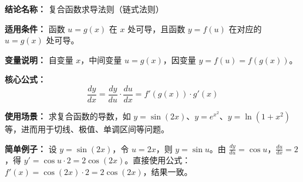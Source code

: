 \textbf{结论名称：} 复合函数求导法则（链式法则）

\textbf{适用条件：} 函数 $u=g(x)$ 在 $x$ 处可导，且函数 $y=f(u)$ 在对应的 $u=g(x)$ 处可导。

\textbf{变量说明：} 自变量 $x$，中间变量 $u=g(x)$，因变量 $y=f(u)=f(g(x))$。

\textbf{核心公式：} 
\[
\boxed{\frac{dy}{dx} = \frac{dy}{du} \cdot \frac{du}{dx} = f'(g(x)) \cdot g'(x)}
\]

\textbf{使用场景：} 求复合函数的导数，如 $y=\sin(2x)$、$y=e^{x^2}$、$y=\ln(1+x^2)$ 等，进而用于切线、极值、单调区间等问题。

\textbf{简单例子：} 设 $y=\sin(2x)$，令 $u=2x$，则 $y=\sin u$。由 $\frac{dy}{du}=\cos u$，$\frac{du}{dx}=2$，得 $y'=\cos u \cdot 2 = 2\cos(2x)$。直接使用公式：$f'(x)=\cos(2x)\cdot 2=2\cos(2x)$，结果一致。